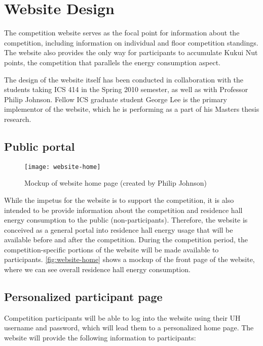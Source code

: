 \section{Website Design}
\label{sec:website-design}

The competition website serves as the focal point for information about the competition, including information on individual and floor competition standings. The website also provides the only way for participants to accumulate Kukui Nut points, the competition that parallels the energy consumption aspect.

The design of the website itself has been conducted in collaboration with the students taking ICS 414 in the Spring 2010 semester, as well as with Professor Philip Johnson. Fellow ICS graduate student George Lee is the primary implementor of the website, which he is performing as a part of his Masters thesis research.

\subsection{Public portal}

\begin{figure}[htb]
	\centering
		\texttt{[image: website-home]}
		\caption{Mockup of website home page (created by Philip Johnson)}
		\label{fig:website-home}
\end{figure}

While the impetus for the website is to support the competition, it is also intended to be provide information about the competition and residence hall energy consumption to the public (non-participants). Therefore, the website is conceived as a general portal into residence hall energy usage that will be available before and after the competition. During the competition period, the competition-specific portions of the website will be made available to participants. \autoref{fig:website-home} shows a mockup of the front page of the website, where we can see overall residence hall energy consumption.

\subsection{Personalized participant page}

Competition participants will be able to log into the website using their UH username and password, which will lead them to a personalized home page. The website will provide the following information to participants:

